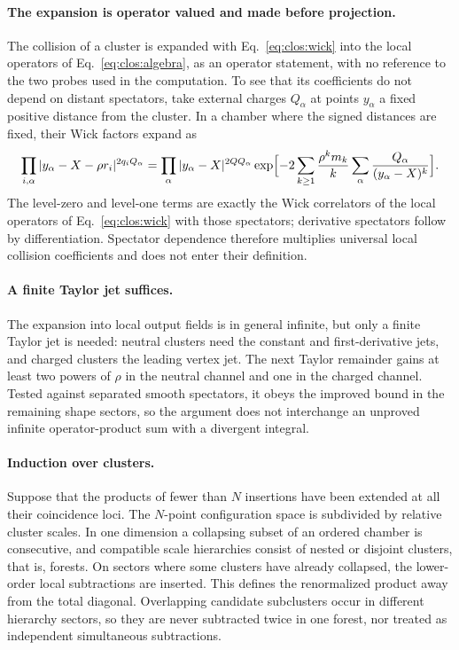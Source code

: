 \documentclass[11pt,a4paper]{article}
\numberwithin{equation}{section}
\begin{document}
\paragraph{The expansion is operator valued and made before projection.} The collision of a cluster is expanded with
Eq.~\eqref{eq:clos:wick} into the local operators of Eq.~\eqref{eq:clos:algebra}, as an operator statement, with no
reference to the two probes used in the computation. To see that its coefficients do not depend on distant spectators,
take external charges $Q_\alpha$ at points $y_\alpha$ a fixed positive distance from the cluster. In a chamber where the
signed distances are fixed, their Wick factors expand as
\begin{equation}
 \prod_{i,\alpha}|y_\alpha-X-\rho r_i|^{2q_iQ_\alpha}
 =\prod_\alpha|y_\alpha-X|^{2QQ_\alpha}
 \exp\Bigl[-2\sum_{k\ge1}\frac{\rho^km_k}{k}\sum_\alpha\frac{Q_\alpha}{(y_\alpha-X)^k}\Bigr].
 \label{eq:clos:spectator}
\end{equation}
The level-zero and level-one terms are exactly the Wick correlators of the local operators of
Eq.~\eqref{eq:clos:wick} with those spectators; derivative spectators follow by differentiation. Spectator dependence
therefore multiplies universal local collision coefficients and does not enter their definition.

\paragraph{A finite Taylor jet suffices.} The expansion into local output fields is in general infinite, but only a
finite Taylor jet is needed: neutral clusters need the constant and first-derivative jets, and charged clusters the
leading vertex jet. The next Taylor remainder gains at least two powers of $\rho$ in the neutral channel and one in the
charged channel. Tested against separated smooth spectators, it obeys the improved bound in the remaining shape
sectors, so the argument does not interchange an unproved infinite operator-product sum with a divergent integral.

\paragraph{Induction over clusters.} Suppose that the products of fewer than $N$ insertions have been extended at all
their coincidence loci. The $N$-point configuration space is subdivided by relative cluster scales. In one dimension a
collapsing subset of an ordered chamber is consecutive, and compatible scale hierarchies consist of nested or disjoint
clusters, that is, forests. On sectors where some clusters have already collapsed, the lower-order local subtractions
are inserted. This defines the renormalized product away from the total diagonal. Overlapping candidate subclusters
occur in different hierarchy sectors, so they are never subtracted twice in one forest, nor treated as independent
simultaneous subtractions.
\end{document}
